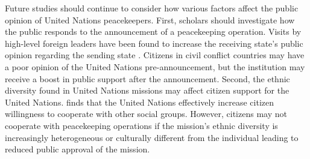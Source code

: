 \documentclass[12pt]{article}
\newcommand{\UN}[1]{United Nations}
\begin{document}
Future studies should continue to consider how various factors affect the public opinion of \UN{} peacekeepers. First, scholars should investigate how the public responds to the announcement of a peacekeeping operation. Visits by high-level foreign leaders have been found to increase the receiving state's public opinion regarding the sending state \citep{goldsmith2021does}. Citizens in civil conflict countries may have a poor opinion of the \UN{} pre-announcement, but the institution may receive a boost in public support after the announcement. Second, the ethnic diversity found in \UN{} missions may affect citizen support for the \UN{}. \cite{nomikos2022peacekeeping} finds that the \UN{} effectively increase citizen willingness to cooperate with other social groups. However, citizens may not cooperate with peacekeeping operations if the mission's ethnic diversity is increasingly heterogeneous or culturally different from the individual leading to reduced public approval of the mission. 

\newpage %
\singlespacing
\end{document}
